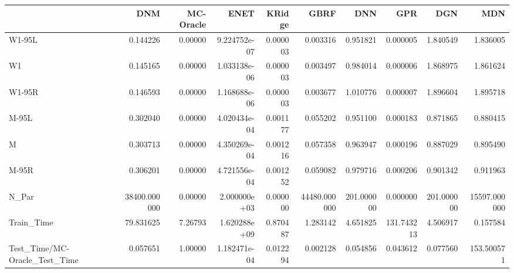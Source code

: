\begin{tabular}{lrrrrrrrrr}
\toprule
{} &           DNM &  MC-Oracle &          ENET &    KRidge &          GBRF &         DNN &         GPR &         DGN &           MDN \\
\midrule
W1-95L                        &      0.144226 &    0.00000 &  9.224752e-07 &  0.000003 &      0.003316 &    0.951821 &    0.000005 &    1.840549 &      1.836005 \\
W1                            &      0.145165 &    0.00000 &  1.033138e-06 &  0.000003 &      0.003497 &    0.984014 &    0.000006 &    1.868975 &      1.861624 \\
W1-95R                        &      0.146593 &    0.00000 &  1.168688e-06 &  0.000003 &      0.003677 &    1.010776 &    0.000007 &    1.896604 &      1.895718 \\
M-95L                         &      0.302040 &    0.00000 &  4.020434e-04 &  0.001177 &      0.055202 &    0.951100 &    0.000183 &    0.871865 &      0.880415 \\
M                             &      0.303713 &    0.00000 &  4.350269e-04 &  0.001216 &      0.057358 &    0.963947 &    0.000196 &    0.887029 &      0.895490 \\
M-95R                         &      0.306201 &    0.00000 &  4.721556e-04 &  0.001252 &      0.059082 &    0.979716 &    0.000206 &    0.901342 &      0.911963 \\
N\_Par                         &  38400.000000 &    0.00000 &  2.000000e+03 &  0.000000 &  44480.000000 &  201.000000 &    0.000000 &  201.000000 &  15597.000000 \\
Train\_Time                    &     79.831625 &    7.26793 &  1.620288e+09 &  0.870487 &      1.283142 &    4.651825 &  131.743213 &    4.506917 &      0.157584 \\
Test\_Time/MC-Oracle\_Test\_Time &      0.057651 &    1.00000 &  1.182471e-04 &  0.012294 &      0.002128 &    0.054856 &    0.043612 &    0.077560 &    153.500571 \\
\bottomrule
\end{tabular}
